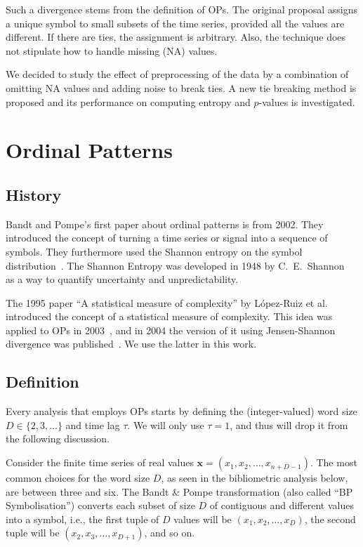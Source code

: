 Such a divergence stems from the definition of OPs.
The original proposal assigns a unique symbol to small subsets of the time series,
provided all the values are different.
If there are ties, the assignment is arbitrary.
Also, the technique does not stipulate how to handle missing (NA) values.

We decided to study the effect of preprocessing of the data by a combination of omitting NA values and adding noise to break ties. 
A new tie breaking method is proposed and its performance on computing entropy and $p$-values is investigated.

\chapter{Ordinal Patterns}

\section{History}
Bandt and Pompe's first paper about ordinal patterns is from 2002. 
They introduced the concept of turning a time series or signal into a sequence of symbols. 
They furthermore used the Shannon entropy on the symbol distribution~\cite{Bandt2002}. 
The Shannon Entropy was developed in 1948 by C.\ E.\ Shannon~\cite{Shannon1948} as a way to quantify uncertainty and unpredictability.

The 1995 paper ``A statistical measure of complexity'' by López-Ruiz et al.~\cite{LopezRuiz1995} introduced the concept of a statistical measure of complexity. 
This idea was applied to OPs in 2003~\cite{Martin2003}, and in 2004 the version of it using Jensen-Shannon divergence was published~\cite{Lamberti2004}.
We use the latter in this work.

\section{Definition}

Every analysis that employs OPs starts by defining the (integer-valued) word size $D\in\{2,3,\dots\}$ and time lag $\tau$.
We will only use $\tau=1$, and thus will drop it from the following discussion.

Consider the finite time series of real values $\bm x=(x_1, x_2,\dots, x_{n+D-1})$. 
The most common choices for the word size $D$, as seen in the bibliometric analysis below, are between three and six.
The Bandt \& Pompe transformation (also called ``BP Symbolisation'') converts each subset of size $D$ of contiguous and different values into a symbol, i.e.,
the first tuple of $D$ values will be $(x_1,x_2,\dots,x_{D})$, 
the second tuple will be $(x_2, x_3,\dots,x_{D+1})$, and so on.

